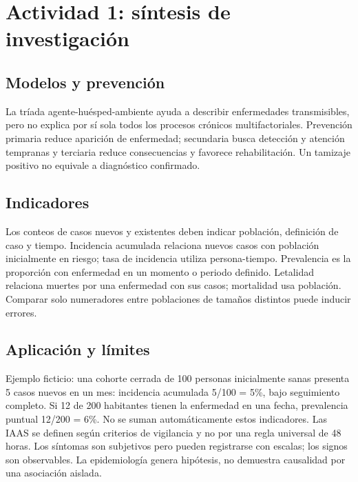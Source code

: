 \def\uadectitulo{Salud pública y epidemiología}


\portadaUAdeC
\section{Actividad 1: síntesis de investigación}
\subsection{Modelos y prevención}
La tríada agente-huésped-ambiente ayuda a describir enfermedades transmisibles, pero no explica por sí sola todos los procesos crónicos multifactoriales. Prevención primaria reduce aparición de enfermedad; secundaria busca detección y atención tempranas y terciaria reduce consecuencias y favorece rehabilitación. Un tamizaje positivo no equivale a diagnóstico confirmado.
\subsection{Indicadores}
Los conteos de casos nuevos y existentes deben indicar población, definición de caso y tiempo. Incidencia acumulada relaciona nuevos casos con población inicialmente en riesgo; tasa de incidencia utiliza persona-tiempo. Prevalencia es la proporción con enfermedad en un momento o periodo definido. Letalidad relaciona muertes por una enfermedad con sus casos; mortalidad usa población. Comparar solo numeradores entre poblaciones de tamaños distintos puede inducir errores.
\subsection{Aplicación y límites}
Ejemplo ficticio: una cohorte cerrada de 100 personas inicialmente sanas presenta 5 casos nuevos en un mes: incidencia acumulada 5/100 = 5\%, bajo seguimiento completo. Si 12 de 200 habitantes tienen la enfermedad en una fecha, prevalencia puntual 12/200 = 6\%. No se suman automáticamente estos indicadores. Las IAAS se definen según criterios de vigilancia y no por una regla universal de 48 horas. Los síntomas son subjetivos pero pueden registrarse con escalas; los signos son observables. La epidemiología genera hipótesis, no demuestra causalidad por una asociación aislada.
